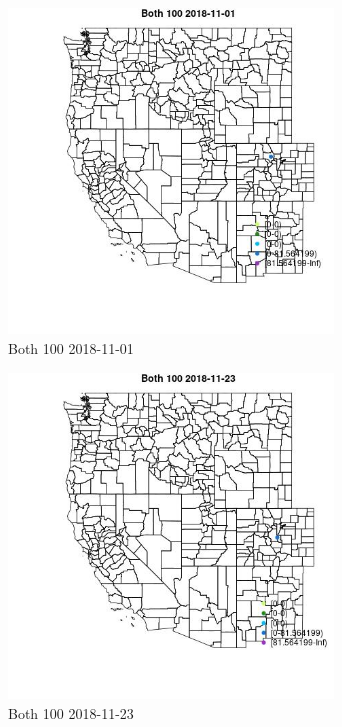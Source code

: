 \begin{figure} 
\centering  
\includegraphics[width=0.77\textwidth]{Code_Outputs/Report_ML_input_PM25_Step4_part_e_de_duplicated_aves_MapObsBoth_1002018-11-01.jpg} 
\caption{\label{fig:Report_ML_input_PM25_Step4_part_e_de_duplicated_avesMapObsBoth_1002018-11-01}Both 100 2018-11-01} 
\end{figure} 
 

\begin{figure} 
\centering  
\includegraphics[width=0.77\textwidth]{Code_Outputs/Report_ML_input_PM25_Step4_part_e_de_duplicated_aves_MapObsBoth_1002018-11-23.jpg} 
\caption{\label{fig:Report_ML_input_PM25_Step4_part_e_de_duplicated_avesMapObsBoth_1002018-11-23}Both 100 2018-11-23} 
\end{figure} 
 

